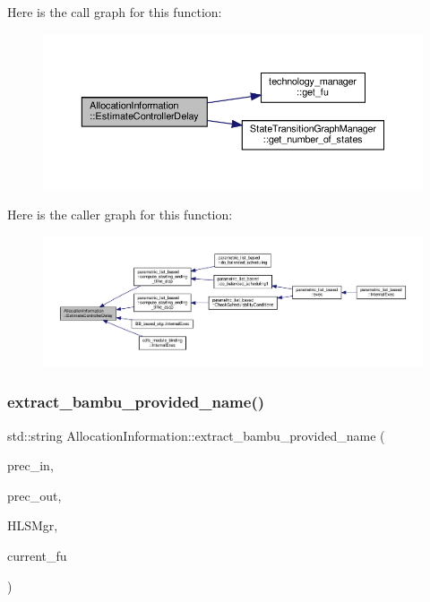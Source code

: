 Here is the call graph for this function\+:
\nopagebreak
\begin{figure}[H]
\begin{center}
\leavevmode
\includegraphics[width=350pt]{d7/d79/classAllocationInformation_af60a2374f76674223eba6246e474f63c_cgraph}
\end{center}
\end{figure}
Here is the caller graph for this function\+:
\nopagebreak
\begin{figure}[H]
\begin{center}
\leavevmode
\includegraphics[width=350pt]{d7/d79/classAllocationInformation_af60a2374f76674223eba6246e474f63c_icgraph}
\end{center}
\end{figure}
\mbox{\label{classAllocationInformation_a8b75a35aaa38a9c7c46a78ac477c1fea}} 
\subsubsection{\texorpdfstring{extract\+\_\+bambu\+\_\+provided\+\_\+name()}{extract\_bambu\_provided\_name()}}
{\footnotesize\ttfamily std\+::string Allocation\+Information\+::extract\+\_\+bambu\+\_\+provided\+\_\+name (\begin{DoxyParamCaption}\item[{unsigned int}]{prec\+\_\+in,  }\item[{unsigned int}]{prec\+\_\+out,  }\item[{const \hyperlink{hls__manager_8hpp_a1b481383e3beabc89bd7562ae672dd8c}{H\+L\+S\+\_\+manager\+Const\+Ref}}]{H\+L\+S\+Mgr,  }\item[{\hyperlink{technology__node_8hpp_a33dd193b7bd6b987bf0d8a770a819fa7}{technology\+\_\+node\+Ref} \&}]{current\+\_\+fu }\end{DoxyParamCaption})\hspace{0.3cm}{\ttfamily [static]}}



